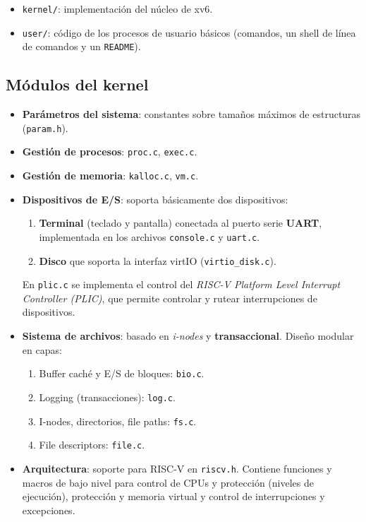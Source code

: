 \documentclass[11pt,a4paper]{article}
\begin{document}
\begin{itemize}[leftmargin=*,nosep]
    \item \texttt{kernel/}: implementación del núcleo de xv6.
    \item \texttt{user/}: código de los procesos de usuario básicos
        (comandos, un shell de línea de comandos y un \texttt{README}).
\end{itemize}

\subsection{Módulos del kernel}

\begin{itemize}[leftmargin=*]
    \item \textbf{Parámetros del sistema}: constantes sobre tamaños
        máximos de estructuras (\texttt{param.h}).
    \item \textbf{Gestión de procesos}: \texttt{proc.c}, \texttt{exec.c}.
    \item \textbf{Gestión de memoria}: \texttt{kalloc.c}, \texttt{vm.c}.
    \item \textbf{Dispositivos de E/S}: soporta básicamente dos
        dispositivos:
        \begin{enumerate}[leftmargin=*,nosep]
            \item \textbf{Terminal} (teclado y pantalla) conectada
                al puerto serie \textbf{UART}, implementada en los
                archivos \texttt{console.c} y \texttt{uart.c}.
            \item \textbf{Disco} que soporta la interfaz virtIO
                (\texttt{virtio\_disk.c}).
        \end{enumerate}
        En \texttt{plic.c} se implementa el control del \emph{RISC-V
        Platform Level Interrupt Controller (PLIC)}, que permite
        controlar y rutear interrupciones de dispositivos.
    \item \textbf{Sistema de archivos}: basado en \emph{i-nodes} y
        \textbf{transaccional}. Diseño modular en capas:
        \begin{enumerate}[leftmargin=*,nosep]
            \item Buffer caché y E/S de bloques: \texttt{bio.c}.
            \item Logging (transacciones): \texttt{log.c}.
            \item I-nodes, directorios, file paths: \texttt{fs.c}.
            \item File descriptors: \texttt{file.c}.
        \end{enumerate}
    \item \textbf{Arquitectura}: soporte para RISC-V en
        \texttt{riscv.h}. Contiene funciones y macros de bajo nivel
        para control de CPUs y protección (niveles de ejecución),
        protección y memoria virtual y control de interrupciones y
        excepciones.
\end{itemize}
\end{document}

